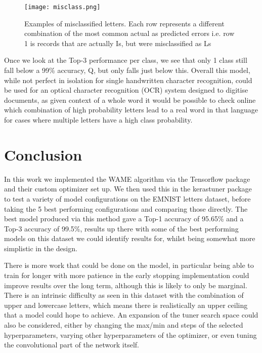 \documentclass[12pt]{article}
\numberwithin{equation}{section}
\numberwithin{figure}{section}
\numberwithin{table}{section}
\begin{document}
\begin{figure}
	\centering
	\captionsetup{justification=centering}
	\texttt{[image: misclass.png]}
	\caption{Examples of misclassified letters. Each row represents a different combination of the most common actual as predicted errors i.e. row 1 is records that are actually Is, but were misclassified as Ls}
	\label{fig:misclass}
\end{figure}

Once we look at the Top-3 performance per class, we see that only 1 class still fall below a 99\% accuracy, Q, but only falls just below this. Overall this model, while not perfect in isolation for single handwritten character recognition, could be used for an optical character recognition (OCR) system designed to digitise documents, as given context of a whole word it would be possible to check online which combination of high probability letters lead to a real word in that language for cases where multiple letters have a high class probability. 

\section{Conclusion}
In this work we implemented the WAME algorithm via the Tensorflow package and their custom optimizer set up. We then used this in the kerastuner package to test a variety of model configurations on the EMNIST letters dataset, before taking the 5 best performing configurations and comparing those directly. The best model produced via this method gave a Top-1 accuracy of 95.65\% and a Top-3 accuracy of 99.5\%, results up there with some of the best performing models on this dataset we could identify results for, whilst being somewhat more simplistic in the design.

There is more work that could be done on the model, in particular being able to train for longer with more patience in the early stopping implementation could improve results over the long term, although this is likely to only be marginal. There is an intrinsic difficulty as seen in this dataset with the combination of upper and lowercase letters, which means there is realistically an upper ceiling that a model could hope to achieve. An expansion of the tuner search space could also be considered, either by changing the max/min and steps of the selected hyperparameters, varying other hyperparameters of the optimizer, or even tuning the convolutional part of the network itself. 
\end{document}
